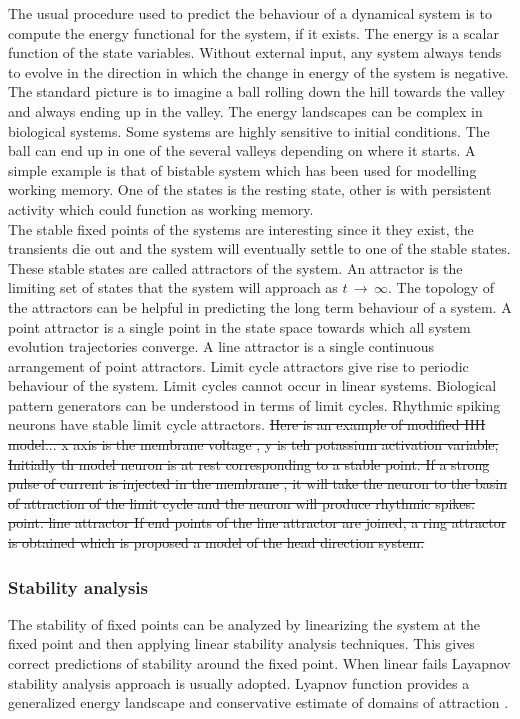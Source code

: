 The usual procedure used to predict the behaviour of a dynamical system is to compute the energy functional for the system, if it exists. The energy is a scalar function of the state variables. Without external input, any system always tends to evolve in the direction in which the change in energy of the system is negative. The standard picture is to imagine a ball rolling down the hill towards the valley and always ending up in the valley. The energy landscapes can be complex in biological systems. Some systems are highly sensitive to initial conditions. The ball can end up in one of the several valleys depending on where it starts. A simple example is that of bistable system which has been used for modelling working memory. One of the states is the resting state, other is with persistent activity which could function as working memory.\\
The stable fixed points of the systems are interesting since it they exist, the transients die out and the system will eventually settle to one of the stable states. These stable states are called attractors of the system. An attractor is the limiting set of states that the system will approach as $t\, \rightarrow \, \infty $. The topology of the attractors can be helpful in predicting the long term behaviour of a system. A point attractor is a single point in the state space towards which all system evolution trajectories converge. A line attractor is a single continuous arrangement of point attractors. Limit cycle attractors give rise to periodic behaviour of the system. Limit cycles cannot occur in linear systems. Biological pattern generators can be understood in terms of limit cycles. Rhythmic spiking neurons have stable limit cycle attractors.  \st{Here is an example of modified HH model... x axis is the membrane voltage , y is teh potassium activation variable, Initially th model neuron is at rest corresponding to a stable point. If a strong pulse of current is injected in the membrane , it will take the neuron to the basin of attraction of the limit cycle and the neuron will produce rhythmic spikes.} \\
\st{point. line attractor If end points of the line attractor are joined, a ring attractor is obtained which is proposed a model of the head direction system.} \\

\subsubsection{Stability analysis}
The stability of fixed points can be analyzed by linearizing the system at the fixed point and then applying linear stability analysis techniques. This gives correct predictions of stability around the fixed point. When linear fails Layapnov stability analysis approach is usually adopted. Lyapnov function provides a generalized energy landscape and conservative estimate of domains of attraction . 
\\
